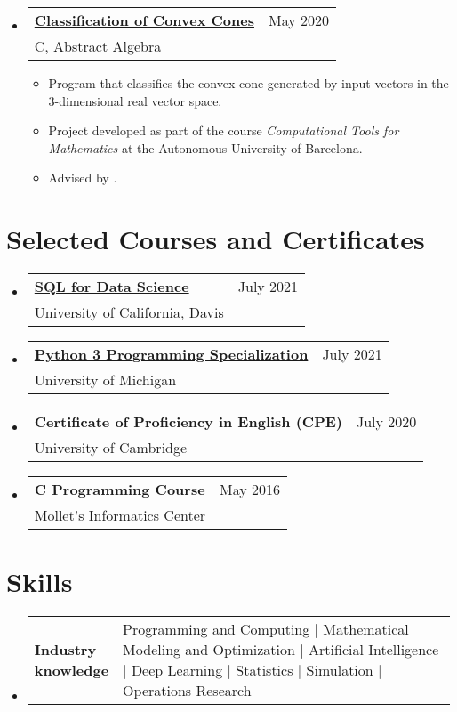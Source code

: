 \documentclass[a4paper,10pt]{article}
\makeatletter
\newcommand{\resumeItemListEnd}{\end{itemize}}
\newcommand{\resumeSectionTypeOne}[2]{
  \item\begin{tabular*}{0.99\textwidth}[t]{
    p{0.18\linewidth}p{0.81\linewidth}
  }
  \textbf{#1} & #2
  \end{tabular*}\vspace{-2pt}
}
\newcommand{\resumeQuadHeading}[4]{
  \item
  \begin{tabular*}{0.96\textwidth}[t]{l@{\extracolsep{\fill}}r}
    \textbf{#1} & \small #2 \\
    \small#3 & \small #4 \\
  \end{tabular*}
}
\newcommand{\resumeHeadingListStart}{
  \begin{itemize}[leftmargin=0.15in, label={}]
}
\newcommand{\resumeHeadingListEnd}{\end{itemize}}
\makeatother
\begin{document}
  \resumeHeadingListStart{}
    \resumeQuadHeading{\href{https://github.com/loredanasandu/cone-classification}{Classification of Convex Cones}}{May 2020}{C, Abstract Algebra}{\href{https://github.com/loredanasandu/cone-classification}{\faGithub \ \graydotuline{Source code}}}
    \begin{itemize}[leftmargin=3em, itemsep=0.1em, topsep=2pt]
      \item \small Program that classifies the convex cone generated by input vectors in the 3-dimensional real vector space.
      \item \small Project developed as part of the course \textit{Computational Tools for Mathematics} at the Autonomous University of Barcelona.
      \item \small Advised by \href{https://mat.uab.cat/geoarit/index.php/people?controller=member&view=member&id=1}{}.
    \end{itemize}
  \resumeItemListEnd{}




\section{Selected Courses and Certificates}
  \resumeHeadingListStart{}
    \resumeQuadHeading{\href{https://www.coursera.org/account/accomplishments/verify/ZNTSZQQ9TLQK}{SQL for Data Science}}{July 2021}{University of California, Davis}{\ }
  \resumeHeadingListEnd{}

  \resumeHeadingListStart{}
    \resumeQuadHeading{\href{https://www.coursera.org/account/accomplishments/specialization/WMG73QR4GJLH}{Python 3 Programming Specialization}}{July 2021}{University of Michigan}{\ }
  \resumeHeadingListEnd{}

  \resumeHeadingListStart{}
    \resumeQuadHeading{Certificate of Proficiency in English (CPE)}{July 2020}{University of Cambridge}{\ }
  \resumeHeadingListEnd{}

  \resumeHeadingListStart{}
    \resumeQuadHeading{C Programming Course}{May 2016}{Mollet's Informatics Center}{\ }
  \resumeHeadingListEnd{}


\section{Skills}
  \resumeHeadingListStart{}
    \resumeSectionTypeOne{Industry knowledge}{Programming and Computing \; $|$ \; Mathematical Modeling and Optimization \; $|$ \; Artificial Intelligence \; $|$ \; Deep Learning \; $|$ \; Statistics \; $|$ \; Simulation \; $|$ \; Operations Research}
  \resumeHeadingListEnd{}
\end{document}

